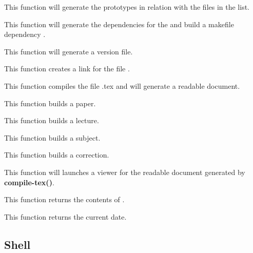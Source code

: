          {
	   This function will generate the prototypes in relation with
	   the files in the list.
	 }

         {
	   This function will generate the dependencies for the
	    and build a makefile dependency
	   .
	 }

         {
	   This function will generate a version file.
	 }

         {
	   This function creates a link  for the file
	   .
	 }

         {
	   This function compiles the file .tex and
	   will generate a readable document.
	 }

         {
	   This function builds a paper.
	 }

         {
	   This function builds a lecture.
	 }

         {
	   This function builds a subject.
	 }

         {
	   This function builds a correction.
	 }

         {
	   This function will launches a viewer for the readable document
	   generated by \textbf{compile-tex()}.
	 }

         {
	   This function returns the contents of .
	 }

         {
	   This function returns the current date.
	 }

%
%

\subsection{Shell}

